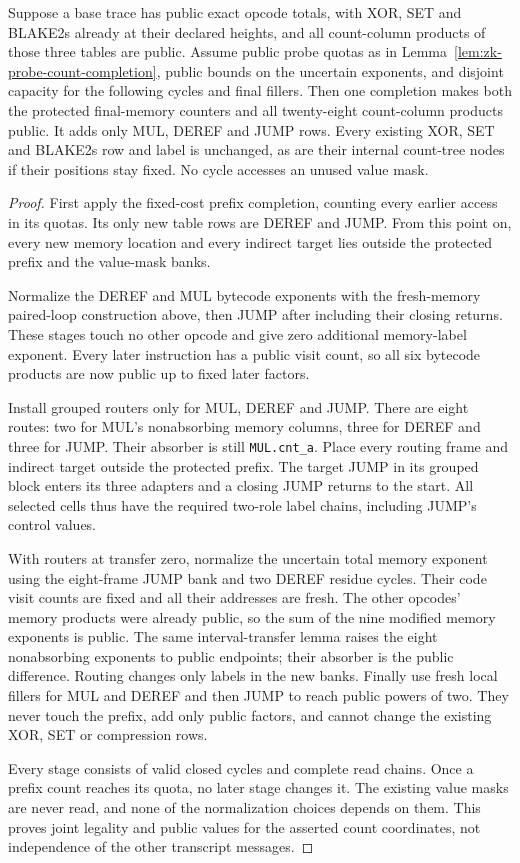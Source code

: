 \begin{proposition}\label{prop:zk-probe-column-completion}
Suppose a base trace has public exact opcode totals, with XOR, SET and BLAKE2s already at their declared heights, and all count-column products of those three tables are public. Assume public probe quotas as in Lemma~\ref{lem:zk-probe-count-completion}, public bounds on the uncertain exponents, and disjoint capacity for the following cycles and final fillers. Then one completion makes both the protected final-memory counters and all twenty-eight count-column products public. It adds only MUL, DEREF and JUMP rows. Every existing XOR, SET and BLAKE2s row and label is unchanged, as are their internal count-tree nodes if their positions stay fixed. No cycle accesses an unused value mask.
\end{proposition}
\begin{proof}
First apply the fixed-cost prefix completion, counting every earlier access in its quotas. Its only new table rows are DEREF and JUMP. From this point on, every new memory location and every indirect target lies outside the protected prefix and the value-mask banks.

Normalize the DEREF and MUL bytecode exponents with the fresh-memory paired-loop construction above, then JUMP after including their closing returns. These stages touch no other opcode and give zero additional memory-label exponent. Every later instruction has a public visit count, so all six bytecode products are now public up to fixed later factors.

Install grouped routers only for MUL, DEREF and JUMP. There are eight routes: two for MUL's nonabsorbing memory columns, three for DEREF and three for JUMP. Their absorber is still \texttt{MUL.cnt\_a}. Place every routing frame and indirect target outside the protected prefix. The target JUMP in its grouped block enters its three adapters and a closing JUMP returns to the start. All selected cells thus have the required two-role label chains, including JUMP's control values.

With routers at transfer zero, normalize the uncertain total memory exponent using the eight-frame JUMP bank and two DEREF residue cycles. Their code visit counts are fixed and all their addresses are fresh. The other opcodes' memory products were already public, so the sum of the nine modified memory exponents is public. The same interval-transfer lemma raises the eight nonabsorbing exponents to public endpoints; their absorber is the public difference. Routing changes only labels in the new banks. Finally use fresh local fillers for MUL and DEREF and then JUMP to reach public powers of two. They never touch the prefix, add only public factors, and cannot change the existing XOR, SET or compression rows.

Every stage consists of valid closed cycles and complete read chains. Once a prefix count reaches its quota, no later stage changes it. The existing value masks are never read, and none of the normalization choices depends on them. This proves joint legality and public values for the asserted count coordinates, not independence of the other transcript messages.
\end{proof}

